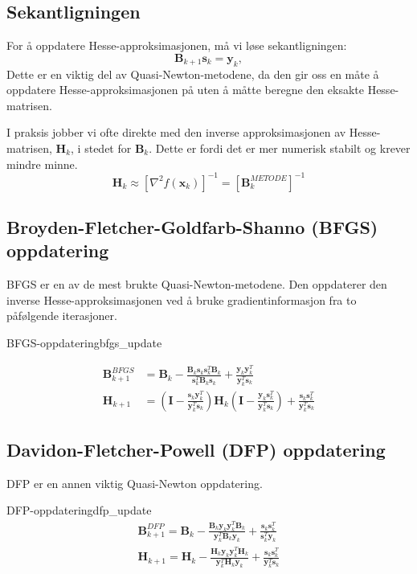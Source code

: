 \subsection{Sekantligningen}
For å oppdatere Hesse-approksimasjonen, må vi løse sekantligningen:
\[
	\symbf{B}_{k+1}\symbf{s}_k = \symbf{y}_k,
\]
Dette er en viktig del av Quasi-Newton-metodene, da den gir oss en måte å oppdatere Hesse-approksimasjonen på uten å måtte beregne den eksakte Hesse-matrisen.

I praksis jobber vi ofte direkte med den inverse approksimasjonen av Hesse-matrisen, \(\symbf{H}_k\), i stedet for \(\symbf{B}_k\). Dette er fordi det er mer numerisk stabilt og krever mindre minne.
\[
	\symbf{H}_k \approx [\nabla^2 f(\symbf{x}_k)]^{-1} =[\symbf{B}_k^{METODE}]^{-1}
\]

\subsection{Broyden-Fletcher-Goldfarb-Shanno (BFGS) oppdatering}
BFGS er en av de mest brukte Quasi-Newton-metodene.
Den oppdaterer den inverse Hesse-approksimasjonen ved å bruke gradientinformasjon fra to påfølgende iterasjoner.

\begin{definition}{BFGS-oppdatering}{bfgs_update}

	\begin{align*}
		\symbf{B}_{k+1}^{BFGS} & = \symbf{B}_k - \frac{\symbf{B}_k\symbf{s}_k\symbf{s}_k^T\symbf{B}_k}{\symbf{s}_k^T\symbf{B}_k\symbf{s}_k} + \frac{\symbf{y}_k\symbf{y}_k^T}{\symbf{y}_k^T\symbf{s}_k}                                                                          \\
		\symbf{H}_{k+1}        & = \left(\symbf{I} - \frac{\symbf{s}_k\symbf{y}_k^T}{\symbf{y}_k^T\symbf{s}_k}\right) \symbf{H}_k \left(\symbf{I} - \frac{\symbf{y}_k\symbf{s}_k^T}{\symbf{y}_k^T\symbf{s}_k}\right) + \frac{\symbf{s}_k\symbf{s}_k^T}{\symbf{y}_k^T\symbf{s}_k}
	\end{align*}

\end{definition}

\subsection{Davidon-Fletcher-Powell (DFP) oppdatering}
DFP er en annen viktig Quasi-Newton oppdatering.

\begin{definition}{DFP-oppdatering}{dfp_update}
	\begin{align*}
		\symbf{B}_{k+1}^{DFP} = \symbf{B}_k - \frac{\symbf{B}_k\symbf{y}_k\symbf{y}_k^T\symbf{B}_k}{\symbf{y}_k^T\symbf{B}_k\symbf{y}_k} + \frac{\symbf{s}_k\symbf{s}_k^T}{\symbf{s}_k^T\symbf{y}_k} \tag{Oppdatering av Hesse-approksimasjonen} \\
		\symbf{H}_{k+1} = \symbf{H}_k - \frac{\symbf{H}_k\symbf{y}_k\symbf{y}_k^T\symbf{H}_k}{\symbf{y}_k^T\symbf{H}_k\symbf{y}_k} + \frac{\symbf{s}_k\symbf{s}_k^T}{\symbf{y}_k^T\symbf{s}_k} \tag{Oppdatering av invers Hesse-approksimasjonen}
	\end{align*}
\end{definition}

